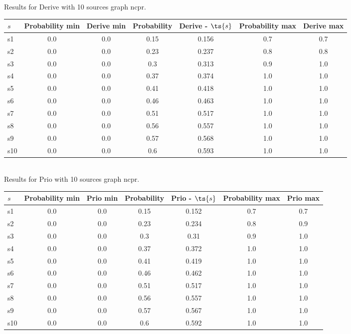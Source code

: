 \documentclass{article}
\begin{document}
\noindent Results for Derive with 10 sources graph ncpr.

\noindent\begin{tabular}{|l|c|c|c|c|c|c|}
\hline
$s$& Probability min & Derive min & Probability & Derive - $\ts{s}$ & Probability max & Derive max\\
\hline
s1 &0.0 & 0.0 & 0.15 & 0.156 & 0.7 & 0.7\\
\hline
s2 &0.0 & 0.0 & 0.23 & 0.237 & 0.8 & 0.8\\
\hline
s3 &0.0 & 0.0 & 0.3 & 0.313 & 0.9 & 1.0\\
\hline
s4 &0.0 & 0.0 & 0.37 & 0.374 & 1.0 & 1.0\\
\hline
s5 &0.0 & 0.0 & 0.41 & 0.418 & 1.0 & 1.0\\
\hline
s6 &0.0 & 0.0 & 0.46 & 0.463 & 1.0 & 1.0\\
\hline
s7 &0.0 & 0.0 & 0.51 & 0.517 & 1.0 & 1.0\\
\hline
s8 &0.0 & 0.0 & 0.56 & 0.557 & 1.0 & 1.0\\
\hline
s9 &0.0 & 0.0 & 0.57 & 0.568 & 1.0 & 1.0\\
\hline
s10 &0.0 & 0.0 & 0.6 & 0.593 & 1.0 & 1.0\\
\hline
\end{tabular}\\

\noindent Results for Prio with 10 sources graph ncpr.

\noindent\begin{tabular}{|l|c|c|c|c|c|c|}
\hline
$s$& Probability min & Prio min & Probability & Prio - $\ts{s}$ & Probability max & Prio max\\
\hline
s1 &0.0 & 0.0 & 0.15 & 0.152 & 0.7 & 0.7\\
\hline
s2 &0.0 & 0.0 & 0.23 & 0.234 & 0.8 & 0.9\\
\hline
s3 &0.0 & 0.0 & 0.3 & 0.31 & 0.9 & 1.0\\
\hline
s4 &0.0 & 0.0 & 0.37 & 0.372 & 1.0 & 1.0\\
\hline
s5 &0.0 & 0.0 & 0.41 & 0.419 & 1.0 & 1.0\\
\hline
s6 &0.0 & 0.0 & 0.46 & 0.462 & 1.0 & 1.0\\
\hline
s7 &0.0 & 0.0 & 0.51 & 0.517 & 1.0 & 1.0\\
\hline
s8 &0.0 & 0.0 & 0.56 & 0.557 & 1.0 & 1.0\\
\hline
s9 &0.0 & 0.0 & 0.57 & 0.567 & 1.0 & 1.0\\
\hline
s10 &0.0 & 0.0 & 0.6 & 0.592 & 1.0 & 1.0\\
\hline
\end{tabular}\\
\end{document}
